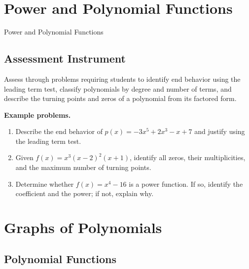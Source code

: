 \section{Power and Polynomial Functions}
\label{sec:powe-3059}

Power and Polynomial Functions

\subsection{Assessment Instrument}
\label{ssec:asse-85d1}

Assess through problems requiring students to identify end behavior using the leading term
test, classify polynomials by degree and number of terms, and describe the turning points
and zeros of a polynomial from its factored form.

\textbf{Example problems.}

\begin{enumerate}
    \item Describe the end behavior of $p(x) = -3x^5 + 2x^3 - x + 7$ and justify using the leading term test.
    \item Given $f(x) = x^3(x - 2)^2(x + 1)$, identify all zeros, their multiplicities, and the maximum number of turning points.
    \item Determine whether $f(x) = x^4 - 16$ is a power function. If so, identify the coefficient and the power; if not, explain why.
\end{enumerate}

\section{Graphs of Polynomials}
\label{sec:grap-918e}

\subsection{Polynomial Functions}
\label{sss:poly-bcf7}


